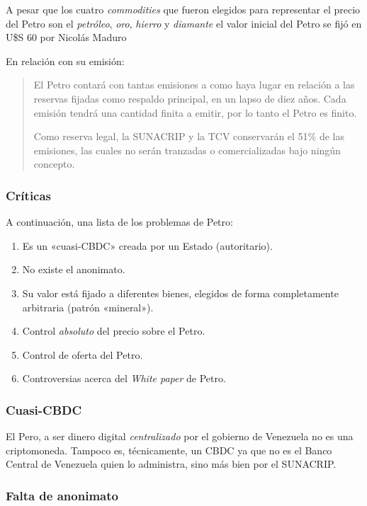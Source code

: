 \documentclass[12pt,a4paper,twoside]{book}
\begin{document}
A pesar que los cuatro \textit{commodities} que fueron elegidos para representar el precio del Petro son el \textit{petróleo}, \textit{oro}, \textit{hierro} y \textit{diamante} el valor inicial del Petro se fijó en U\$S 60 por Nicolás Maduro \cite[pág. 6]{petro:whitepaper}

En relación con su emisión:

\begin{quotation}
El Petro contará con tantas emisiones a como haya lugar en relación a las reservas fijadas como respaldo principal, en un lapso de diez años. Cada emisión tendrá una cantidad finita a emitir, por lo tanto el Petro es finito.

Como reserva legal, la SUNACRIP y la TCV conservarán el 51\% de las emisiones, las cuales no serán tranzadas o comercializadas bajo ningún concepto. \cite[pág. 7]{petro:whitepaper}
\end{quotation}

\subsubsection{Críticas}
A continuación, una lista de los problemas de Petro:

\begin{enumerate}
\item Es un «cuasi-CBDC» creada por un Estado (autoritario). 
\item No existe el anonimato.
\item Su valor está fijado a diferentes bienes, elegidos de forma completamente arbitraria (patrón «mineral»).
\item Control \textit{absoluto} del precio sobre el Petro.
\item Control de oferta del Petro.
\item Controversias acerca del \textit{White paper} de Petro.
\end{enumerate}

\subsubsection{Cuasi-CBDC}

El Pero, a ser dinero digital \textit{centralizado} por el gobierno de Venezuela no es una criptomoneda. Tampoco es, técnicamente, un CBDC ya que no es el Banco Central de Venezuela quien lo administra, sino más bien por el SUNACRIP.

\subsubsection{Falta de anonimato}
\end{document}
